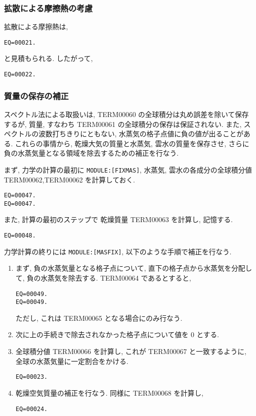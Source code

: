 \subsubsection{拡散による摩擦熱の考慮}

拡散による摩擦熱は,
\begin{verbatim}
EQ=00021.
\end{verbatim}
と見積もられる.
したがって,
\begin{verbatim}
EQ=00022.
\end{verbatim}

\subsubsection{質量の保存の補正}

スペクトル法による取扱いは,
TERM00060 の全球積分は丸め誤差を除いて保存するが,
質量, すなわち TERM00061 の全球積分の保存は保証されない.
また, スペクトルの波数打ちきりにともない,
水蒸気の格子点値に負の値が出ることがある.
これらの事情から, 
乾燥大気の質量と水蒸気, 雲水の質量を保存させ,
さらに負の水蒸気量となる領域を除去するための補正を行なう.

まず, 力学の計算の最初に \texttt{MODULE:[FIXMAS]},
水蒸気, 雲水の各成分の全球積分値 TERM00062,TERM00062 を計算しておく.
\begin{verbatim}
EQ=00047.
EQ=00047.
\end{verbatim}
また, 計算の最初のステップで
乾燥質量 TERM00063 を計算し, 記憶する.
\begin{verbatim}
EQ=00048.
\end{verbatim}

力学計算の終りには \texttt{MODULE:[MASFIX]},
以下のような手順で補正を行なう.
\begin{enumerate}
\item まず, 負の水蒸気量となる格子点について,
      直下の格子点から水蒸気を分配して,
      負の水蒸気を除去する.
      TERM00064 であるとすると,
      \begin{verbatim}
EQ=00049.
EQ=00049.
\end{verbatim}
      ただし, これは TERM00065 となる場合にのみ行なう.

\item 次に上の手続きで除去されなかった格子点について値を 0 とする.

\item 全球積分値 TERM00066 を計算し,
      これが TERM00067 と一致するように,
      全球の水蒸気量に一定割合をかける.

      \begin{verbatim}
EQ=00023.
\end{verbatim}
      
\item 乾燥空気質量の補正を行なう.
      同様に TERM00068 を計算し,

      \begin{verbatim}
EQ=00024.
\end{verbatim}

\end{enumerate}


